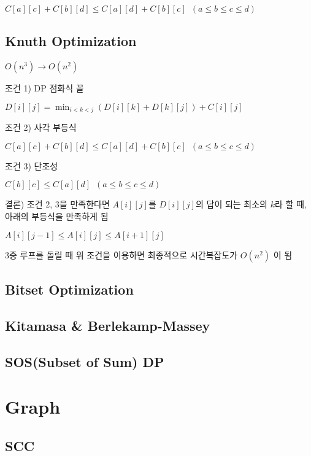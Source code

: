 \documentclass[9pt,landscape,a4paper,twocolumn]{extarticle}
\begin{document}
$C[a][c] + C[b][d] \leq C[a][d] + C[b][c] \phantom{1} (a \leq b \leq c \leq d)$



\subsection{Knuth Optimization}

$O(n^{3}) \to O(n^{2})$

조건 1) DP 점화식 꼴

$D[i][j] = \min_{i<k<j}( D[i][k] + D[k][j] ) + C[i][j]$

조건 2) 사각 부등식

$C[a][c] + C[b][d] \leq C[a][d] + C[b][c] \phantom{1} (a \leq b \leq c \leq d)$

조건 3) 단조성

$C[b][c] \leq C[a][d] \phantom{1} (a \leq b \leq c \leq d)$

결론) 조건 2, 3을 만족한다면  $A[i][j]$를 $D[i][j]$의 답이 되는 최소의 $k$라 할 때, 아래의 부등식을 만족하게 됨

$A[i][j-1] \leq A[i][j] \leq A[i+1][j]$

3중 루프를 돌릴 때 위 조건을 이용하면 최종적으로 시간복잡도가 $O(n^{2})$ 이 됨



\subsection{Bitset Optimization}


\subsection{Kitamasa \& Berlekamp-Massey}


\subsection{SOS(Subset of Sum) DP}


\section{Graph}

\subsection{SCC}

\end{document}
